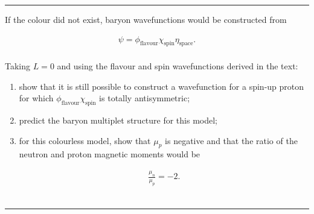 \noindent\rule{7in}{1.5pt}


\begin{problem}{9.10}
If the colour did not exist, baryon wavefunctions would be constructed from

\begin{align*}
    \psi = \phi_\text{flavour} \chi_\text{spin} \eta_\text{space} .
\end{align*}\\
Taking $L = 0$ and using the flavour and spin wavefunctions derived in the text:

\begin{enumerate}[label=(\alph*)]
    \item show that it is still possible to construct a wavefunction for a spin-up proton for which $\phi_\text{flavour} \chi_\text{spin}$ is totally antisymmetric;
    \item predict the baryon multiplet structure for this model;
    \item for this colourless model, show that $\mu_p$ is negative and that the ratio of the neutron and proton magnetic moments would be
    
    \begin{align*}
        \frac{\mu_n}{\mu_p} = -2 .
    \end{align*}\\
\end{enumerate}
\end{problem}
\begin{solution}

\end{solution}

\noindent\rule{7in}{1.5pt}

